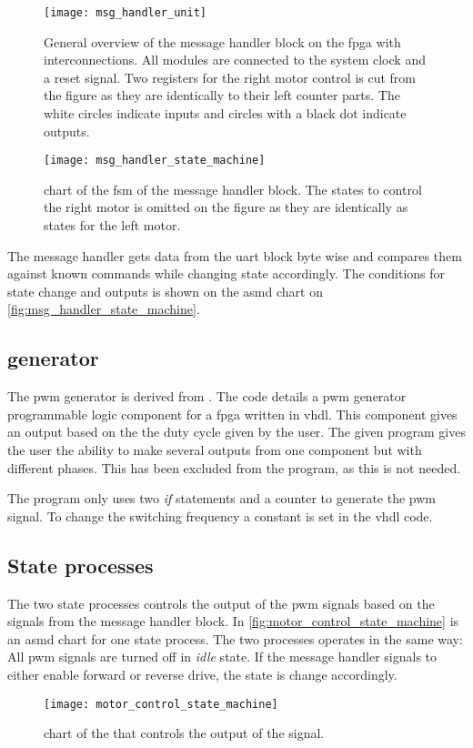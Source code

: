 \begin{figure}[h]
    \centering
    \texttt{[image: msg\_handler\_unit]}
    \caption{General overview of the message handler block on the \gls{fpga} with interconnections. All modules are connected to the system clock and a reset signal. Two registers for the right motor control is cut from the figure as they are identically to their left counter parts. The white circles indicate inputs and circles with a black dot indicate outputs.}
    \label{fig:msg_handler_unit}
\end{figure}

\begin{figure}[h]%
\centering%
\texttt{[image: msg\_handler\_state\_machine]}%
\caption{ chart of the \gls{fsm} of the message handler block. The states to control the right motor is omitted on the figure as they are identically as states for the left motor.}%
\label{fig:msg_handler_state_machine}%
\end{figure}

The  message handler gets data from the \gls{uart} block byte wise and compares them against known commands while changing state accordingly. The conditions for state change and outputs is shown on the \gls{asmd} chart on \autoref{fig:msg_handler_state_machine}.

\subsection{ generator}
The \gls{pwm} generator is derived from \cite{larson2015}. The code details a \gls{pwm} generator programmable logic component for a \gls{fpga} written in \gls{vhdl}. This component gives an output based on the the duty cycle given by the user. The given program gives the user the ability to make several outputs from one component but with different phases. This has been excluded from the program, as this is not needed.

The program only uses two \textit{if} statements and a counter to generate the \gls{pwm} signal. To change the switching frequency a constant is set in the \gls{vhdl} code.


\subsection{State processes}
The two state processes controls the output of the \gls{pwm} signals based on the signals from the message handler block. In \autoref{fig:motor_control_state_machine} is an \gls{asmd} chart for one state process. The two processes operates in the same way: All \gls{pwm} signals are turned off in \textit{idle} state. If the message handler signals to either enable forward or reverse drive, the state is change accordingly. 


\begin{figure}[h]%
\centering%
\texttt{[image: motor\_control\_state\_machine]}%
\caption{ chart of the  that controls the output of the  signal.}%
\label{fig:motor_control_state_machine}%
\end{figure}